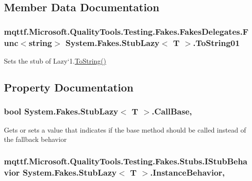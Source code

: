 \subsection{Member Data Documentation}
\hypertarget{class_system_1_1_fakes_1_1_stub_lazy_3_01_t_01_4_acf1f1cfa09104eeb7c24dbcd9a92a16c}{
\subsubsection[{To\-String01}]{\setlength{\rightskip}{0pt plus 5cm}mqttf.\-Microsoft.\-Quality\-Tools.\-Testing.\-Fakes.\-Fakes\-Delegates.\-Func$<$string$>$ System.\-Fakes.\-Stub\-Lazy$<$ T $>$.To\-String01}}\label{class_system_1_1_fakes_1_1_stub_lazy_3_01_t_01_4_acf1f1cfa09104eeb7c24dbcd9a92a16c}


Sets the stub of Lazy`1.\hyperlink{class_system_1_1_fakes_1_1_stub_lazy_3_01_t_01_4_aee5547fcc578aeced2fc205244ccb84b}{To\-String()}



\subsection{Property Documentation}
\hypertarget{class_system_1_1_fakes_1_1_stub_lazy_3_01_t_01_4_a10e1278a602330f56e3e1078c9ff6a93}{
\subsubsection[{Call\-Base}]{\setlength{\rightskip}{0pt plus 5cm}bool System.\-Fakes.\-Stub\-Lazy$<$ T $>$.Call\-Base\hspace{0.3cm}{\ttfamily [get]}, {\ttfamily [set]}}}\label{class_system_1_1_fakes_1_1_stub_lazy_3_01_t_01_4_a10e1278a602330f56e3e1078c9ff6a93}


Gets or sets a value that indicates if the base method should be called instead of the fallback behavior

\hypertarget{class_system_1_1_fakes_1_1_stub_lazy_3_01_t_01_4_ab0af5b59864cd914c71035637e9ef53d}{
\subsubsection[{Instance\-Behavior}]{\setlength{\rightskip}{0pt plus 5cm}mqttf.\-Microsoft.\-Quality\-Tools.\-Testing.\-Fakes.\-Stubs.\-I\-Stub\-Behavior System.\-Fakes.\-Stub\-Lazy$<$ T $>$.Instance\-Behavior\hspace{0.3cm}{\ttfamily [get]}, {\ttfamily [set]}}}\label{class_system_1_1_fakes_1_1_stub_lazy_3_01_t_01_4_ab0af5b59864cd914c71035637e9ef53d}


